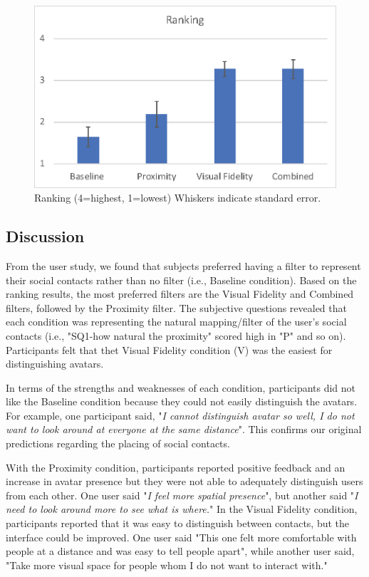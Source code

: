 \begin{figure}[ht]
    \centering
    \includegraphics[width=.8\linewidth]{images/mgia17/analysis-images-04.eps}
    \caption{Ranking (4=highest, 1=lowest) Whiskers indicate standard error.}
    \label{fig:contacts:ranking}
\end{figure}

\subsection{Discussion}

From the user study, we found that subjects preferred having a filter to represent their social contacts rather than no filter (i.e., Baseline condition). Based on the ranking results, the most preferred filters are the Visual Fidelity and Combined filters, followed by the Proximity filter.
The subjective questions revealed that each condition was representing the natural mapping/filter of the user's social contacts (i.e., "SQ1-how natural the proximity" scored high in "P" and so on). Participants felt that thet Visual Fidelity condition (V) was the easiest for distinguishing avatars.

In terms of the strengths and weaknesses of each condition, participants did not like the Baseline condition because they could not easily distinguish the avatars. For example, one participant said, "\textit{I cannot distinguish avatar so well, I do not want to look around at everyone at the same distance}". This confirms our original predictions regarding the placing of social contacts.

With the Proximity condition, participants reported positive feedback and an increase in avatar presence but they were not able to adequately distinguish users from each other.  One user said "\textit{I feel more spatial presence}", but another said "\textit{I need to look around more to see what is where.}"
In the Visual Fidelity condition, participants reported that it was easy to distinguish between contacts, but the interface could be improved. One user said "This one felt more comfortable with people at a distance and was easy to tell people apart", while another user said, "Take more visual space for people whom I do not want to interact with."

